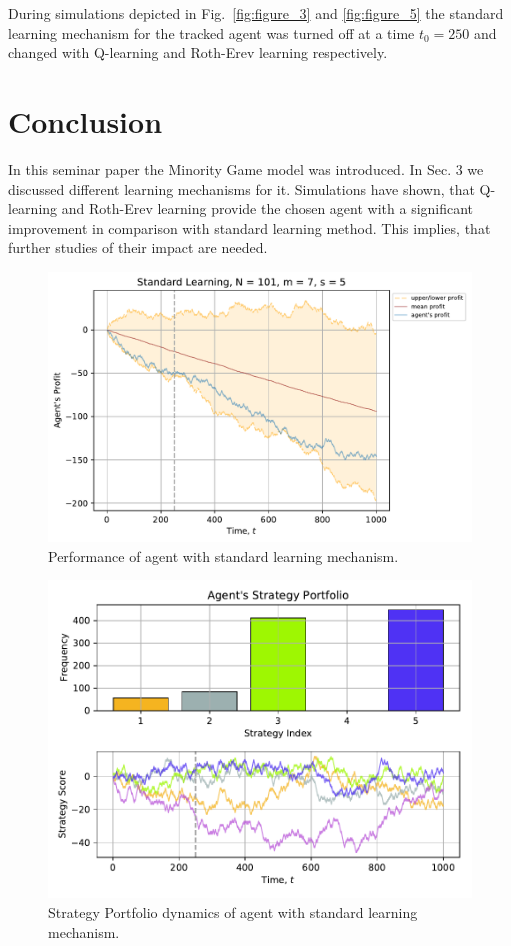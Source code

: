 \documentclass[12pt,american,czech]{article}
\begin{document}
During simulations depicted in Fig.~\ref{fig:figure_3} and \ref{fig:figure_5} the standard learning mechanism for the tracked agent was turned off at a time $t_{0}=250$ and changed with Q-learning and Roth-Erev learning respectively. 

\section{Conclusion}

In this seminar paper the Minority Game model was introduced. In Sec. 3 we discussed different learning mechanisms for it. Simulations have shown, that Q-learning and Roth-Erev learning provide the chosen agent with a significant improvement in comparison with standard learning method. This implies, that further studies of their impact are needed.

\newpage{}

\begin{figure}[ht!]
\centering
\includegraphics[width=0.8\linewidth]{Images/figure_4}
\caption{Performance of agent with standard learning mechanism.}
\label{fig:figure_1}
\end{figure}

\begin{figure}[ht!]
\centering
\includegraphics[width=0.7\linewidth]{Images/figure_5}
\caption{Strategy Portfolio dynamics of agent with standard learning mechanism.}
\label{fig:figure_2}
\end{figure}
\end{document}
